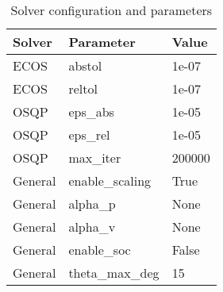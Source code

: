 \begin{table}[t]
\centering
\begin{tabular}{lll}
\toprule
Solver & Parameter & Value \\
\midrule
ECOS & abstol & 1e-07 \\
ECOS & reltol & 1e-07 \\
OSQP & eps_abs & 1e-05 \\
OSQP & eps_rel & 1e-05 \\
OSQP & max_iter & 200000 \\
General & enable_scaling & True \\
General & alpha_p & None \\
General & alpha_v & None \\
General & enable_soc & False \\
General & theta_max_deg & 15 \\
\bottomrule
\end{tabular}
\caption{Solver configuration and parameters}
\label{tab:solver_settings}
\end{table}
